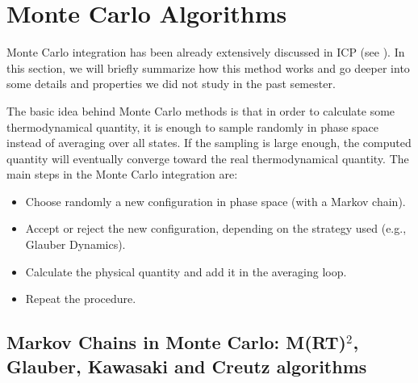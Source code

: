 

\section{Monte Carlo Algorithms}

Monte Carlo integration has been already extensively discussed in ICP (see \citep{comp_phys}). In this section, we will briefly summarize how this method works and go deeper into some details and properties we did not study in the past semester. 

\vspace{0.2cm}
\noindent
The basic idea behind Monte Carlo methods is that in order to calculate some thermodynamical quantity, it is enough to sample randomly in phase space instead of averaging over all states. If the sampling is large enough, the computed quantity will eventually converge toward the real thermodynamical quantity. The main steps in the Monte Carlo integration are:

\begin{itemize}
\item Choose randomly a new configuration in phase space (with a Markov chain).
\item Accept or reject the new configuration, depending on the strategy used (e.g., Glauber Dynamics).
\item Calculate the physical quantity and add it in the averaging loop.
\item Repeat the procedure.
\end{itemize}


\subsection{Markov Chains in Monte Carlo: M(RT)$^2$, Glauber, Kawasaki and Creutz algorithms}


